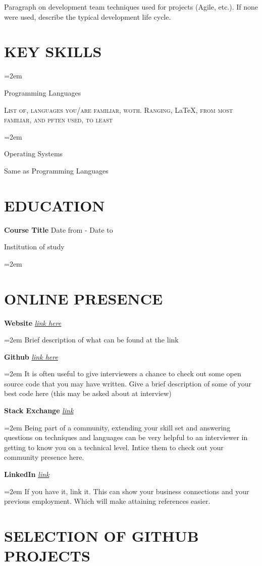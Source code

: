 \documentclass[paper=a4,fontsize=10pt]{scrartcl}		%
\newlength{\spacebox}
\newcommand{\sepspace}{\vspace*{1em}}			  	%
\newcommand{\NewPart}[1]{\section*{\uppercase{#1}}}
\newcommand{\PersonalEntry}[2]{
		\noindent\hangindent=2em\hangafter=0 		%
		\parbox{\spacebox}{				%
		\textit{#1}}					%
		\hspace{1.5em} #2 \par}				%
\newcommand{\SkillsEntry}[2]{					%
		\noindent\hangindent=2em\hangafter=0 		%
		\parbox{\spacebox}{				%
		{#1}}						%
		\hspace{1.5em} #2 \par}				%
\newcommand{\EducationEntry}[5]{
		\noindent \textbf{#1} \hfill			%
		#2 \par						%
		\noindent #3 					%
		\hfill #4 \par					%
		\noindent\hangindent=2em\hangafter=0 \small #5 	%
		\normalsize \par}
\newcommand{\OnlineEntry}[3]{					%
		\noindent \textbf{#1} \hfill 			%
		\noindent \textit{\href{#2}{#2}} \par		%
		\noindent \hangindent=2em \hangafter=0 \small #3%
		\normalsize \par}
\begin{document}
{{		\par Paragraph on development team techniques used for projects (Agile, etc.). If none were used, describe the typical development life cycle.

\NewPart{Key Skills}
{
	\SkillsEntry{Programming Languages}{\textsc{List of}, \textsc{languages you}/\textsc{are familiar}, \textsc{woth. Ranging}, \LaTeX, \textsc{from most familiar}, \textsc{and pften used}, \textsc{to least}}
	\sepspace
	\SkillsEntry{Operating Systems}{Same as Programming Languages}
}

\NewPart{Education}
{ 
	\EducationEntry{Course Title}{Date from - Date to}{Institution of study}{}
	{
	}
	
}

\NewPart{Online Presence}
{
	\OnlineEntry{Website}{link here}
	{
		Brief description of what can be found at the link
	}
	\sepspace

	\OnlineEntry{Github}{link here}
	{
		It is often useful to give interviewers a chance to check out some open source code that you may have written. Give a brief description of some of your best code here (this may be asked about at interview)
	}
	\sepspace

	\OnlineEntry{Stack Exchange}{link}
	{
		Being part of a community, extending your skill set and answering questions on techniques and languages can be very helpful to an interviewer in getting to know you on a technical level. Intice them to check out your community presence here.
	}
	\sepspace

	\OnlineEntry{LinkedIn}{link}
	{
		If you have it, link it. This can show your business connections and your previous employment. Which will make attaining references easier.
	}
}


\NewPart{Selection of GitHub Projects}
{
	
}}}
\end{document}
